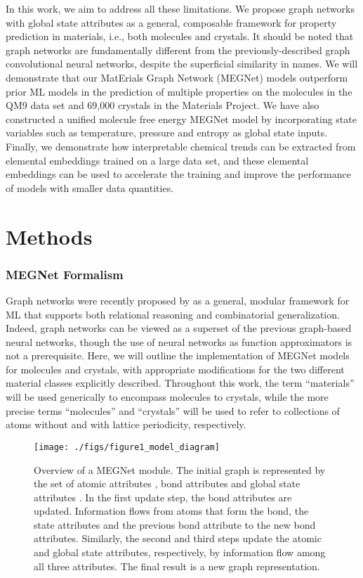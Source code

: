 \documentclass[manuscript=article]{achemso}
\begin{document}
In this work, we aim to address all these limitations. We propose graph networks\cite{Battaglia2018} with global state attributes as a general, composable framework for property prediction in materials, i.e., both molecules and crystals. It should be noted that graph networks are fundamentally different from the previously-described graph convolutional neural networks,\cite{Xie2017} despite the superficial similarity in names. We will demonstrate that our MatErials Graph Network (MEGNet) models outperform prior ML models in the prediction of multiple properties on the  molecules in the QM9 data set\cite{Ramakrishnan2014} and  69,000 crystals in the Materials Project.\cite{Jain2013} We have also constructed a unified molecule free energy MEGNet model by incorporating state variables such as temperature, pressure and entropy as global state inputs. Finally, we demonstrate how interpretable chemical trends can be extracted from elemental embeddings trained on a large data set, and these elemental embeddings can be used to accelerate the training and improve the performance of models with smaller data quantities.

\section{Methods}

\subsubsection{MEGNet Formalism}

Graph networks were recently proposed by \citet{Battaglia2018} as a general, modular framework for ML that supports both relational reasoning and combinatorial generalization. Indeed, graph networks can be viewed as a superset of the previous graph-based neural networks, though the use of neural networks as function approximators is not a prerequisite. Here, we will outline the implementation of MEGNet models for molecules and crystals, with appropriate modifications for the two different material classes explicitly described. Throughout this work, the term ``materials'' will be used generically to encompass molecules to crystals, while the more precise terms ``molecules'' and ``crystals'' will be used to refer to collections of atoms without and with lattice periodicity, respectively.  

\begin{figure}[htp]
\texttt{[image: ./figs/figure1\_model\_diagram]}
\caption{\label{fig:gnmodule} Overview of a MEGNet module. The initial graph is represented by the set of atomic attributes , bond attributes  and global state attributes . In the first update step, the bond attributes are updated. Information flows from atoms that form the bond, the state attributes and the previous bond attribute to the new bond attributes. Similarly, the second and third steps update the atomic and global state attributes, respectively, by information flow among all three attributes. The final result is a new graph representation.} 
\end{figure}
\end{document}
